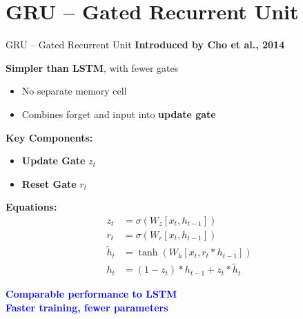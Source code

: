 \section{GRU – Gated Recurrent Unit}
\begin{frame}[allowframebreaks]{GRU – Gated Recurrent Unit}
    \textbf{Introduced by Cho et al., 2014}

    \vspace{1em}
    \textbf{Simpler than LSTM}, with fewer gates

    \begin{itemize}
        \item No separate memory cell
        \item Combines forget and input into \textbf{update gate}
    \end{itemize}

    \vspace{1em}
    \textbf{Key Components:}
    \begin{itemize}
        \item \textbf{Update Gate} $z_t$
        \item \textbf{Reset Gate} $r_t$
    \end{itemize}

\framebreak
    \textbf{Equations:}
    \begin{align*}
        z_t &= \sigma(W_z[x_t, h_{t-1}]) \\
        r_t &= \sigma(W_r[x_t, h_{t-1}]) \\
        \tilde{h}_t &= \tanh(W_h[x_t, r_t * h_{t-1}]) \\
        h_t &= (1 - z_t) * h_{t-1} + z_t * \tilde{h}_t
    \end{align*}

    \vspace{1em}
    \textcolor{blue}{\textbf{Comparable performance to LSTM}} \\
    \textcolor{blue}{\textbf{Faster training, fewer parameters}}
\end{frame}


